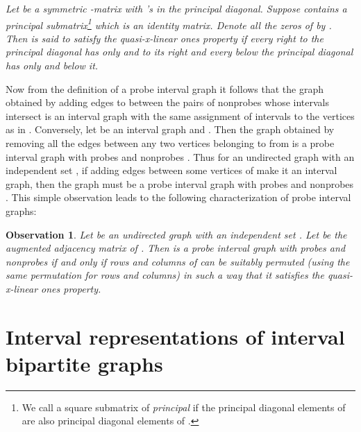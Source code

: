 \documentclass[secthm]{elsart}
\newtheorem{obs}[thm]{Observation}
\begin{document}
\begin{defn} 
{\em Let  be a symmetric -matrix with 's in the principal diagonal. Suppose  contains a principal submatrix\footnote{We call a square submatrix  of  {\em{principal}} if the principal diagonal elements of  are also principal diagonal elements of .}  which is an identity matrix. Denote all the zeros of  by . Then  is said to satisfy the {\em{quasi-x-linear ones property}} if every  right to the principal diagonal has only  and  to its right and every  below the principal diagonal has only  and  below it.}  
\end{defn}

\vspace{1em} Now from the definition of a probe interval graph  it follows that the graph obtained by adding edges to  between the pairs of nonprobes whose intervals intersect is an interval graph with the same assignment of intervals to the vertices as in . Conversely, let  be an interval graph and . Then the graph obtained by removing all the edges between any two vertices belonging to  from  is a probe interval graph with probes  and nonprobes . Thus for an undirected graph  with an independent set , if adding edges between some vertices of  make it an interval graph, then the graph  must be a probe interval graph with probes  and nonprobes . This simple observation leads to the following characterization of probe interval graphs:

\vspace{2em}\begin{obs}\label{o:char1}
Let  be an undirected graph with an independent set . Let  be the augmented adjacency matrix of . Then  is a probe interval graph with probes  and nonprobes  if and only if rows and columns of  can be suitably permuted (using the same permutation for rows and columns) in such a way that it satisfies the quasi-x-linear ones property. 
\end{obs}

\vspace{-1.5em} \section{Interval representations of interval bipartite graphs}
\end{document}
